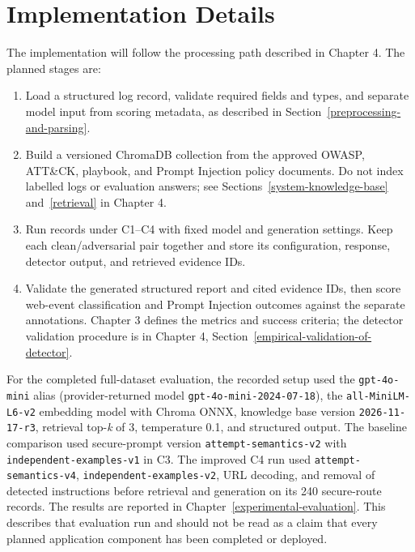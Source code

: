 \section{Implementation Details}\label{implementation-details}

The implementation will follow the processing path described in Chapter 4.
The planned stages are:

\begin{enumerate}
\def\labelenumi{\arabic{enumi}.}
\tightlist
\item
  Load a structured log record, validate required fields and types, and
  separate model input from scoring metadata, as described in
  Section~\ref{preprocessing-and-parsing}.
\item
  Build a versioned ChromaDB collection from the approved OWASP, ATT\&CK,
  playbook, and Prompt Injection policy documents. Do not index labelled
  logs or evaluation answers; see Sections~\ref{system-knowledge-base}
  and~\ref{retrieval} in Chapter 4.
\item
  Run records under C1--C4 with fixed model and generation settings.
  Keep each clean/adversarial pair together and store its configuration,
  response, detector output, and retrieved evidence IDs.
\item
  Validate the generated structured report and cited evidence IDs, then score web-event
  classification and Prompt Injection outcomes against the separate
  annotations. Chapter 3 defines the metrics and success criteria; the
  detector validation procedure is in Chapter 4,
  Section~\ref{empirical-validation-of-detector}.
\end{enumerate}

For the completed full-dataset evaluation, the recorded setup used the
\texttt{gpt-4o-mini} alias (provider-returned model
\texttt{gpt-4o-mini-2024-07-18}), the
\texttt{all-MiniLM-L6-v2} embedding model with Chroma ONNX, knowledge
base version \texttt{2026-11-17-r3}, retrieval top-\emph{k} of 3,
temperature 0.1, and structured output. The baseline comparison used
secure-prompt version \texttt{attempt-semantics-v2} with
\texttt{independent-examples-v1} in C3. The improved C4 run used
\texttt{attempt-semantics-v4}, \texttt{independent-examples-v2}, URL
decoding, and removal of detected instructions before retrieval and
generation on its 240 secure-route records. The results are reported in
Chapter~\ref{experimental-evaluation}. This describes that evaluation
run and should not be read as a claim that every planned application
component has been completed or deployed.

